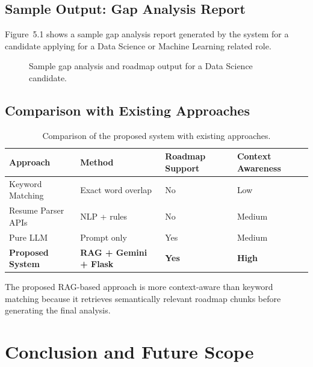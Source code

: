 \documentclass[12pt,a4paper]{report}
\begin{document}
\section{Sample Output: Gap Analysis Report}

Figure~5.1 shows a sample gap analysis report generated by the system for a
candidate applying for a Data Science or Machine Learning related role.

\begin{figure}[H]
  \centering
  \caption{Sample gap analysis and roadmap output for a Data Science candidate.}
\end{figure}

\section{Comparison with Existing Approaches}

\begin{table}[H]
\centering
\caption{Comparison of the proposed system with existing approaches.}
\begin{tabular}{|p{3.5cm}|p{3cm}|p{3cm}|p{3cm}|}
\hline
\textbf{Approach} & \textbf{Method} & \textbf{Roadmap Support} & \textbf{Context Awareness} \\
\hline
Keyword Matching & Exact word overlap & No & Low \\
\hline
Resume Parser APIs & NLP + rules & No & Medium \\
\hline
Pure LLM & Prompt only & Yes & Medium \\
\hline
\textbf{Proposed System} & \textbf{RAG + Gemini + Flask} & \textbf{Yes} & \textbf{High} \\
\hline
\end{tabular}
\end{table}

The proposed RAG-based approach is more context-aware than keyword matching
because it retrieves semantically relevant roadmap chunks before generating the
final analysis.

\chapter{Conclusion and Future Scope}
\end{document}
